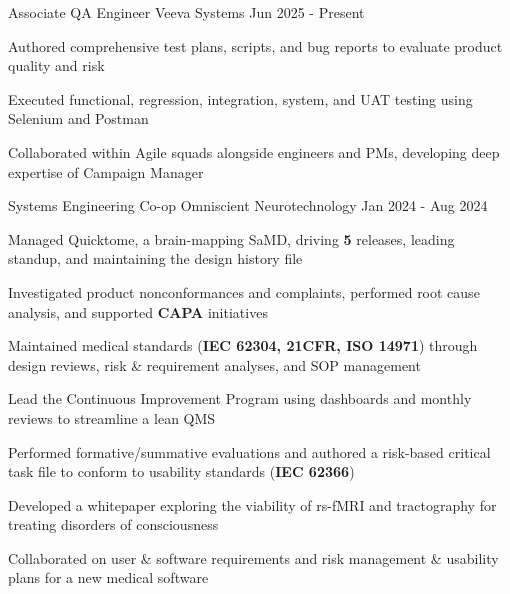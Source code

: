 \documentclass[11pt, a4paper]{russell}
\begin{document}
\begin{cventries}
\cventry
  {Associate QA Engineer} %
  {Veeva Systems} %
  {} %
  {Jun 2025 - Present} %
  {
    \begin{cvitems}
        \item {Authored comprehensive test plans, scripts, and bug reports to evaluate product quality and risk}
        \item {Executed functional, regression, integration, system, and UAT testing using Selenium and Postman}
        \item {Collaborated within Agile squads alongside engineers and PMs, developing deep expertise of Campaign Manager}
    \end{cvitems}
  }
\cventry
  {Systems Engineering Co-op} %
  {Omniscient Neurotechnology} %
  {} %
  {Jan 2024 - Aug 2024} %
  {
    \begin{cvitems}
        \item {Managed Quicktome, a brain-mapping SaMD, driving \textbf{5} releases, leading standup, and maintaining the design history file}
        \item {Investigated product nonconformances and complaints, performed root cause analysis, and supported \textbf{CAPA} initiatives}
        \item {Maintained medical standards (\textbf{IEC 62304, 21CFR, ISO 14971}) through design reviews, risk \& requirement analyses, and SOP management}
        \item {Lead the Continuous Improvement Program using dashboards and monthly reviews to streamline a lean QMS}
        \item {Performed formative/summative evaluations and authored a risk-based critical task file to conform to usability standards (\textbf{IEC 62366})}
        \item {Developed a whitepaper exploring the viability of rs-fMRI and tractography for treating disorders of consciousness}
        \item {Collaborated on user \& software requirements and risk management \& usability plans for a new medical software}
    \end{cvitems}
  }


\end{cventries}
\end{document}
